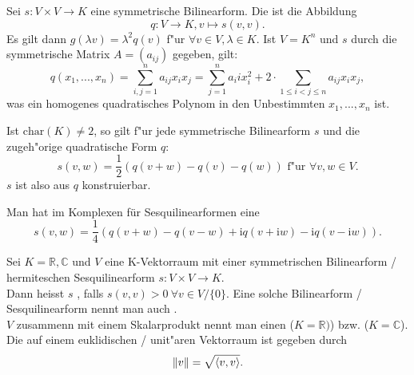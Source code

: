 \documentclass[11pt, a4paper]{article}
\begin{document}
\begin{definition}
Sei $s: V \times V \rightarrow K$ eine symmetrische Bilinearform. Die  ist die Abbildung
\begin{equation*}
q : V \rightarrow K, v \mapsto s(v, v).
\end{equation*}
Es gilt dann $g(\lambda v) = \lambda^2 q(v)$ f"ur  $\forall v \in V, \lambda \in K$.
Ist $V = K^n$ und $s$ durch die symmetrische Matrix $A = (a_{ij})$ gegeben, gilt:
\begin{equation*}
q(x_1, ..., x_n) = \sum\limits_{i, j = 1}^n a_{ij} x_i x_j = \sum\limits_{j = 1}^n a_ii x_i^2 + 2 \cdot \sum\limits_{1 \leq i < j \leq n} a_{ij}x_ix_j,
\end{equation*}
was ein homogenes quadratisches Polynom in den Unbestimmten $x_1, ..., x_n$ ist.
\end{definition}

\begin{theorem} 
Ist $\textrm{char}(K) \neq 2$, so gilt f"ur jede symmetrische Bilinearform $s$ und die zugeh"orige quadratische Form $q$:
\begin{equation*}
s(v, w) = \frac{1}{2}(q(v+w)-q(v)-q(w)) \text{ f"ur } \forall v, w \in V.
\end{equation*}
$s$ ist also aus $q$ konstruierbar.
\end{theorem}

\begin{theorem} 
Man hat im Komplexen für Sesquilinearformen eine 
\begin{equation*}
s(v, w)=\frac{1}{4}(q(v+w)-q(v-w)+\mathrm{i} q(v+\mathrm{i} w)-\mathrm{i} q(v-\mathrm{i} w)).
\end{equation*}
\end{theorem}

\begin{definition}
Sei $K = \mathbb{R}, \mathbb{C}$ und $V$ eine K-Vektorraum mit einer symmetrischen Bilinearform / hermiteschen Sesquilinearform $s : V \times V \rightarrow K$. 
\\ Dann heisst $s$ , falls $s(v, v) > 0 \ \forall v \in V/\{0\}$.
Eine solche Bilinearform / Sesquilinearform nennt man auch .
\\$V$ zusammenn mit einem Skalarprodukt nennt man einen  ($K = \mathbb{R})$) bzw.  ($K = \mathbb{C}$).
\\Die {} auf einem euklidischen / unit"aren Vektorraum ist gegeben durch
\begin{equation*}
\\
\| v\| = \sqrt{\left\langle v , v \right\rangle}.
\end{equation*}
\end{definition}
\end{document}

